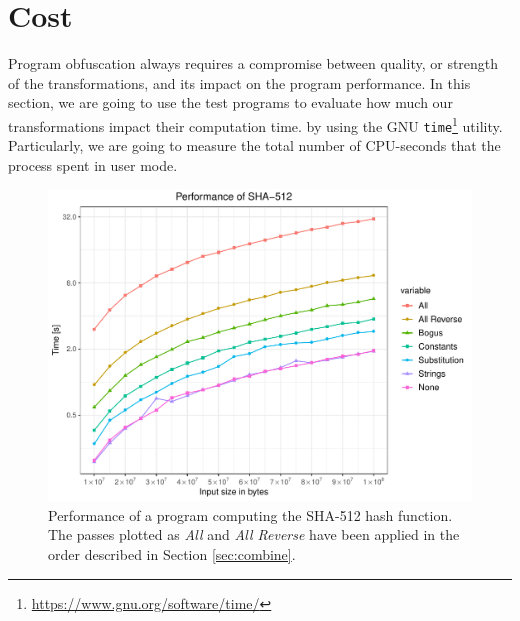 \documentclass[
  digital, %
  notable,   %
  twoside, %
  nolof,     %
  nolot,     %
]{fithesis3}
\theoremstyle{definition}
\begin{document}
\section{Cost}
Program obfuscation always requires a compromise between quality, or strength of the transformations, and its impact on the program performance. In this section, we are going to use the test programs to evaluate how much our transformations impact their computation time.  by using the GNU \texttt{time}\footnote{\url{https://www.gnu.org/software/time/}} utility. Particularly, we are going to measure the total number of CPU-seconds that the process spent in user mode. 

\begin{figure}[!h]
    \centering
    \includegraphics[width=\textwidth]{sha_bench.pdf}
    \caption{Performance of a program computing the SHA-512 hash function. The passes plotted as \textit{All} and \textit{All Reverse} have been applied in the order described in Section \ref{sec:combine}.}
    \label{fig:sha_bench}
\end{figure}
\end{document}
